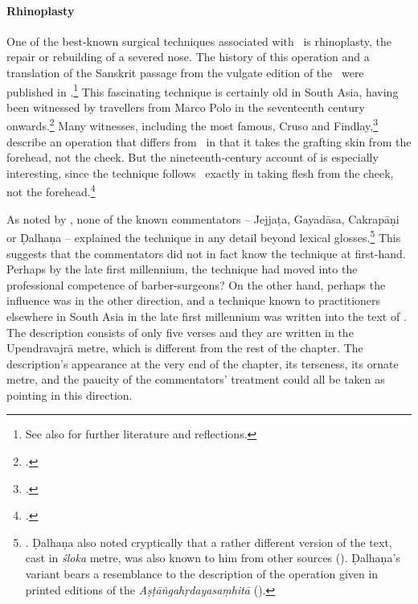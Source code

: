 \paragraph{Rhinoplasty}
\label{sec:rhinoplasty}

One of the best-known surgical techniques associated with \SS\ is rhinoplasty, the repair or rebuilding of a severed nose. The history of this operation and a translation of the Sanskrit passage from
the vulgate edition of the \SS\ were published in \citet[67--70, 
99--100]{wuja-2003}.\footnote{See
also \cite[IB, 327--328, note 186]{meul-hist} for further literature and
reflections.}  This fascinating technique is certainly old in South Asia, having
been witnessed by travellers from Marco Polo in the seventeenth century
onwards.\footcite[ii.301]{manu-stor} Many witnesses, including the most famous,
Cruso and Findlay,\footcite[883, 891\,f.]{cowasjee} describe an operation that
differs from \SS\ in that it takes the grafting skin from the
forehead, not the cheek.  But the nineteenth-century account of
\citeauthor{thor-bann} is especially interesting, since the technique follows
\SS\ exactly in taking flesh from the cheek, not the
forehead.\footcite[352--3]{thor-bann}

As noted by \citeauthor{meul-hist}, none of the known commentators -- Jejjaṭa,
Gayadāsa, Cakrapāṇi or Ḍalhaṇa -- explained the technique in any detail beyond
lexical glosses.\footnote{\cite[IB, 328]{meul-hist}. Ḍalhaṇa also noted
cryptically that a rather different version of the text, cast in \emph{śloka}
metre, was also known to him from other sources (). 
Ḍalhaṇa's variant bears a resemblance to the description of the operation given in
printed editions of the \emph{Aṣṭāṅgahṛdayasaṃhitā} 
().}
This suggests that the commentators did not in fact know the technique at
first-hand. 
Perhaps by the late first
millennium, the technique had moved into the professional competence of
barber-surgeons?  On the other hand, perhaps the influence was in the other
direction, and a technique known to practitioners elsewhere in South Asia in the
late first millennium was written into the text of \SS. The description consists
of only five verses and they are written in the Upendravajrā metre, which is
different from the rest of the chapter.  The description's appearance at the very
end of the chapter, its terseness, its ornate metre, and the paucity of the
commentators' treatment could all be taken as pointing in this direction.

